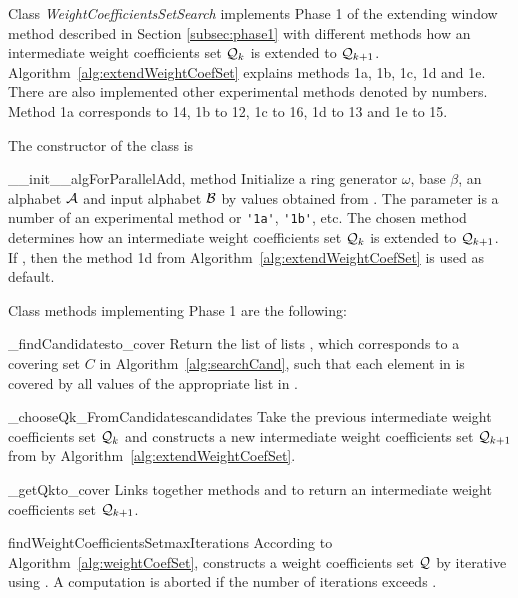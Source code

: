 Class \emph{WeightCoefficientsSetSearch} implements Phase 1 of the extending window method described in Section \ref{subsec:phase1} with different methods how an intermediate weight coefficients set $\mathcal{Q}_k$ is extended to $\mathcal{Q}_{k+1}$. Algorithm~\ref{alg:extendWeightCoefSet} explains methods 1a, 1b, 1c, 1d and 1e. There are also implemented other experimental methods denoted by numbers. Method 1a corresponds to 14, 1b to 12, 1c to 16, 1d to 13 and 1e to 15. 

The constructor of the class is 

\begin{method}{\_\_init\_\_}{algForParallelAdd, method}
Initialize a ring generator $\omega$, base $\beta$, an alphabet $\mathcal{A}$ and input alphabet $\mathcal{B}$ by values obtained from . The parameter  is a number of an experimental method or \verb+'1a'+, \verb+'1b'+, etc. The chosen method determines how an intermediate weight coefficients set $\mathcal{Q}_k$ is extended to $\mathcal{Q}_{k+1}$. If , then the method 1d from Algorithm~\ref{alg:extendWeightCoefSet} is used as default.
\end{method}

Class methods implementing Phase 1 are the following:

\begin{method}{\_findCandidates}{to\_cover}
 Return the list of lists , which corresponds to a covering set $C$ in Algorithm~\ref{alg:searchCand}, such that each element in  is covered by all values of the appropriate list in .  
\end{method}


\begin{method}{\_chooseQk\_FromCandidates}{candidates}
Take the previous intermediate weight coefficients set $\mathcal{Q}_{k}$ and constructs a new intermediate weight coefficients set $\mathcal{Q}_{k+1}$ from  by Algorithm~\ref{alg:extendWeightCoefSet}.
\end{method}


\begin{method}{\_getQk}{to\_cover}
Links together methods  and  to return an intermediate weight coefficients set $\mathcal{Q}_{k+1}$.
\end{method}

\begin{method}{findWeightCoefficientsSet}{maxIterations}
According to  Algorithm~\ref{alg:weightCoefSet}, constructs a weight coefficients set $\mathcal{Q}$ by iterative using . A computation is aborted if the number of iterations exceeds . 
\end{method}

